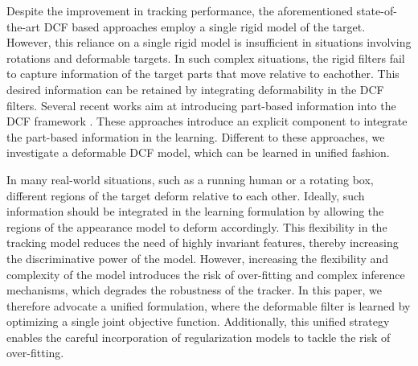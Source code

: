 \documentclass[runningheads,a4paper]{llncs}
\begin{document}
Despite the improvement in tracking performance, the aforementioned state-of-the-art DCF based approaches employ a single rigid model of the target. However, this reliance on a single rigid model is insufficient in situations involving rotations and deformable targets. In such complex situations, the rigid filters fail to capture information of the target parts that move relative to eachother. This desired information can be retained by integrating deformability in the DCF filters. Several recent works aim at introducing part-based information into the DCF framework \cite{liu2015real}\cite{li2015reliable}\cite{lukevzivc2016deformable}. These approaches introduce an explicit component to integrate the part-based information in the learning. Different to these approaches, we investigate a deformable DCF  model, which can be learned in unified fashion.

In many real-world situations, such as a running human or a rotating box, different regions of the target deform relative to each other. Ideally, such information should be integrated in the learning formulation by allowing the regions of the appearance model to deform accordingly. This flexibility in the tracking model reduces the need of highly invariant features, thereby increasing the discriminative power of the model. However, increasing the flexibility  and complexity of the model introduces the risk of over-fitting and complex inference mechanisms, which degrades the robustness of the tracker. In this paper, we therefore advocate a unified formulation, where the deformable filter is learned by optimizing a single joint objective function. Additionally, this unified strategy enables the careful incorporation of regularization models to tackle the risk of over-fitting.
\end{document}
